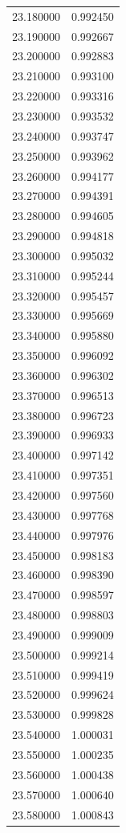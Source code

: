\begin{tabular}{rr}
23.180000 & 0.992450 \\
23.190000 & 0.992667 \\
23.200000 & 0.992883 \\
23.210000 & 0.993100 \\
23.220000 & 0.993316 \\
23.230000 & 0.993532 \\
23.240000 & 0.993747 \\
23.250000 & 0.993962 \\
23.260000 & 0.994177 \\
23.270000 & 0.994391 \\
23.280000 & 0.994605 \\
23.290000 & 0.994818 \\
23.300000 & 0.995032 \\
23.310000 & 0.995244 \\
23.320000 & 0.995457 \\
23.330000 & 0.995669 \\
23.340000 & 0.995880 \\
23.350000 & 0.996092 \\
23.360000 & 0.996302 \\
23.370000 & 0.996513 \\
23.380000 & 0.996723 \\
23.390000 & 0.996933 \\
23.400000 & 0.997142 \\
23.410000 & 0.997351 \\
23.420000 & 0.997560 \\
23.430000 & 0.997768 \\
23.440000 & 0.997976 \\
23.450000 & 0.998183 \\
23.460000 & 0.998390 \\
23.470000 & 0.998597 \\
23.480000 & 0.998803 \\
23.490000 & 0.999009 \\
23.500000 & 0.999214 \\
23.510000 & 0.999419 \\
23.520000 & 0.999624 \\
23.530000 & 0.999828 \\
23.540000 & 1.000031 \\
23.550000 & 1.000235 \\
23.560000 & 1.000438 \\
23.570000 & 1.000640 \\
23.580000 & 1.000843 \\

\end{tabular}
